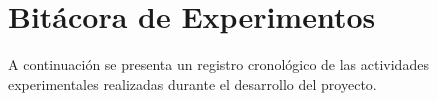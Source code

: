 \section{Bitácora de Experimentos}
\label{sec:bitacora}

A continuación se presenta un registro cronológico de las actividades experimentales realizadas durante el desarrollo del proyecto.

% 